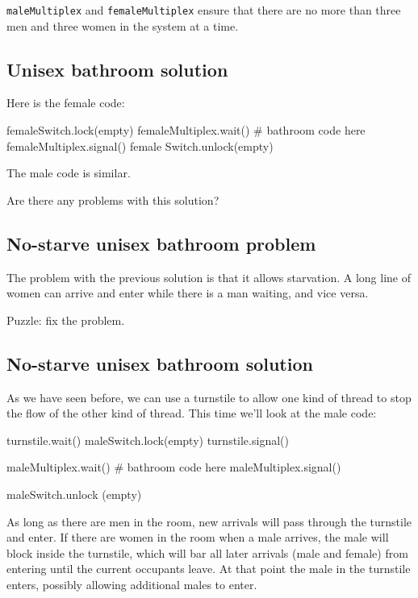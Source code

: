 \documentclass{book}
\begin{document}
{\tt maleMultiplex} and {\tt femaleMultiplex} ensure that there are no
more than three men and three women in the system at a time.



\subsection {Unisex bathroom solution}

Here is the female code:


\begin{unbreakable}[title={Unisex bathroom solution (female)}]{}
femaleSwitch.lock(empty)
    femaleMultiplex.wait()
        # bathroom code here
    femaleMultiplex.signal()
female Switch.unlock(empty)
\end{unbreakable}

The male code is similar.

Are there any problems with this solution?


\subsection {No-starve unisex bathroom problem}

The problem with the previous solution is that it allows starvation.
A long line of women can arrive and enter while there is a man
waiting, and vice versa.

Puzzle: fix the problem.



\subsection {No-starve unisex bathroom solution}

As we have seen before, we can use a turnstile to allow one
kind of thread to stop the flow of the other kind of thread.
This time we'll look at the male code:

\begin{unbreakable}[title={No-starve unisex bathroom solution (male)}]{}
turnstile.wait()
    maleSwitch.lock(empty)
turnstile.signal()

    maleMultiplex.wait()
        # bathroom code here
    maleMultiplex.signal()

maleSwitch.unlock (empty)
\end{unbreakable}

As long as there are men in the room, new arrivals will pass
through the turnstile and enter.  If there are women in the room
when a male arrives, the male will block inside the turnstile,
which will bar all later arrivals (male and female) from entering
until the current occupants leave.  At that point the male in
the turnstile enters, possibly allowing additional males to enter.
\end{document}
